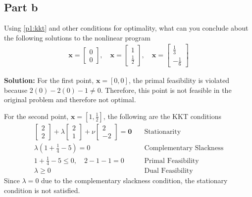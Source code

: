\documentclass[11pt]{article}
\begin{document}
\subsection{Part b}
Using \ref{p1:kkt} and other conditions for optimality, what can you conclude about the following solutions to the nonlinear program
\begin{align*}
  \textbf{x} = 
  \begin{bmatrix}
    0 \\ 0
  \end{bmatrix}
  , \quad
  \textbf{x} = 
  \begin{bmatrix}
    1 \\ \frac{1}{2}
  \end{bmatrix}
  , \quad 
  \textbf{x} = 
  \begin{bmatrix}
    \frac{1}{3} \\ -\frac{1}{6}
  \end{bmatrix}
\end{align*}

\textbf{Solution: }
For the first point, $\textbf{x} = [0,0]$, the primal feasibility is violated because $2(0) - 2(0) -1 \neq 0$.
Therefore, this point is not feasible in the original problem and therefore not optimal.

For the second point, $\textbf{x} = [1, \frac{1}{2}]$, the following are the KKT conditions
\begin{align*}
  \begin{bmatrix}
    2 \\ 2
  \end{bmatrix}
  +
  \lambda
  \begin{bmatrix}
    2 \\ 1
  \end{bmatrix}
  +
  \nu
  \begin{bmatrix}
    2 \\ -2
  \end{bmatrix}
  = \textbf{0}
  & \quad \text{Stationarity} \\
  \lambda (1 + \frac{1}{4} - 5) = 0 
  & \quad \text{Complementary Slackness} \\
  1 + \frac{1}{4} - 5 \leq 0, \quad 2 - 1 - 1 = 0
  & \quad \text{Primal Feasibility} \\
  \lambda \geq 0 
  & \quad \text{Dual Feasibility}
\end{align*}
Since $\lambda=0$ due to the complementary slackness condition, the stationary condition is not satisfied.
\end{document}
